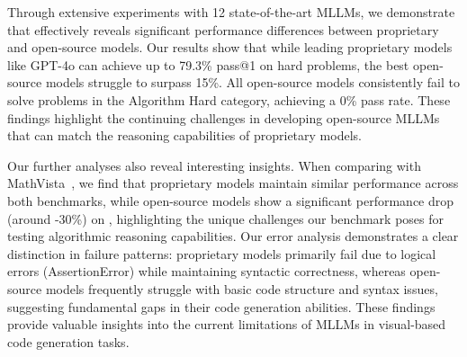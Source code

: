 Through extensive experiments with 12 state-of-the-art MLLMs, we demonstrate that \benchmark effectively reveals significant performance differences between proprietary and open-source models. Our results show that while leading proprietary models like GPT-4o can achieve up to 79.3\% pass@1 on hard problems, the best open-source models struggle to surpass 15\%. All open-source models consistently fail to solve problems in the Algorithm Hard category, achieving a 0\% pass rate. These findings highlight the continuing challenges in developing open-source MLLMs that can match the reasoning capabilities of proprietary models.

Our further analyses also reveal interesting insights. When comparing with MathVista~\cite{lu2024mathvista}, we find that proprietary models maintain similar performance across both benchmarks, while open-source models show a significant performance drop (around -30\%) on \benchmark, highlighting the unique challenges our benchmark poses for testing algorithmic reasoning capabilities. Our error analysis demonstrates a clear distinction in failure patterns: proprietary models primarily fail due to logical errors (AssertionError) while maintaining syntactic correctness, whereas open-source models frequently struggle with basic code structure and syntax issues, suggesting fundamental gaps in their code generation abilities. These findings provide valuable insights into the current limitations of MLLMs in visual-based code generation tasks.


